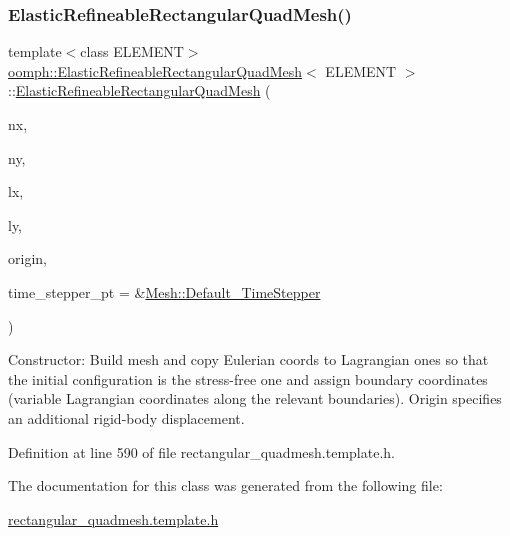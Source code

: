 \subsubsection{\texorpdfstring{Elastic\+Refineable\+Rectangular\+Quad\+Mesh()}{ElasticRefineableRectangularQuadMesh()}\hspace{0.1cm}{\footnotesize\ttfamily [3/3]}}
{\footnotesize\ttfamily template$<$class E\+L\+E\+M\+E\+NT$>$ \\
\hyperlink{classoomph_1_1ElasticRefineableRectangularQuadMesh}{oomph\+::\+Elastic\+Refineable\+Rectangular\+Quad\+Mesh}$<$ E\+L\+E\+M\+E\+NT $>$\+::\hyperlink{classoomph_1_1ElasticRefineableRectangularQuadMesh}{Elastic\+Refineable\+Rectangular\+Quad\+Mesh} (\begin{DoxyParamCaption}\item[{const unsigned \&}]{nx,  }\item[{const unsigned \&}]{ny,  }\item[{const double \&}]{lx,  }\item[{const double \&}]{ly,  }\item[{const \hyperlink{classoomph_1_1Vector}{Vector}$<$ double $>$ \&}]{origin,  }\item[{\hyperlink{classoomph_1_1TimeStepper}{Time\+Stepper} $\ast$}]{time\+\_\+stepper\+\_\+pt = {\ttfamily \&\hyperlink{classoomph_1_1Mesh_a12243d0fee2b1fcee729ee5a4777ea10}{Mesh\+::\+Default\+\_\+\+Time\+Stepper}} }\end{DoxyParamCaption})\hspace{0.3cm}{\ttfamily [inline]}}



Constructor\+: Build mesh and copy Eulerian coords to Lagrangian ones so that the initial configuration is the stress-\/free one and assign boundary coordinates (variable Lagrangian coordinates along the relevant boundaries). Origin specifies an additional rigid-\/body displacement. 



Definition at line 590 of file rectangular\+\_\+quadmesh.\+template.\+h.



The documentation for this class was generated from the following file\+:\begin{DoxyCompactItemize}
\item 
\hyperlink{rectangular__quadmesh_8template_8h}{rectangular\+\_\+quadmesh.\+template.\+h}\end{DoxyCompactItemize}
